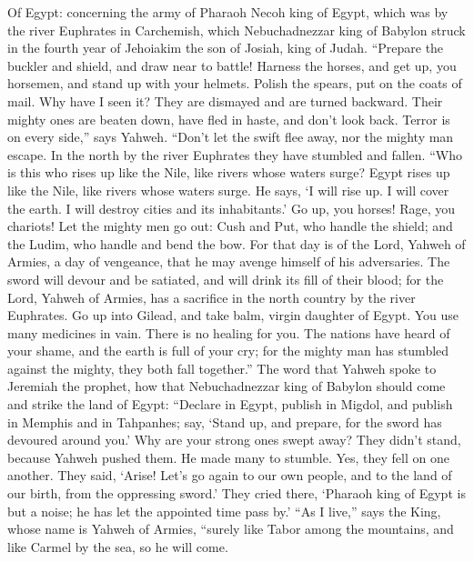  Of Egypt: concerning the army of Pharaoh Necoh king of
Egypt, which was by the river Euphrates in Carchemish, which
Nebuchadnezzar king of Babylon struck in the fourth year of Jehoiakim
the son of Josiah, king of Judah.  ``Prepare the buckler and
shield, and draw near to battle!  Harness the horses, and
get up, you horsemen, and stand up with your helmets. Polish the spears,
put on the coats of mail.  Why have I seen it? They are
dismayed and are turned backward. Their mighty ones are beaten down,
have fled in haste, and don't look back. Terror is on every side,'' says
Yahweh.  ``Don't let the swift flee away, nor the mighty man
escape. In the north by the river Euphrates they have stumbled and
fallen.  ``Who is this who rises up like the Nile, like
rivers whose waters surge?  Egypt rises up like the Nile,
like rivers whose waters surge. He says, `I will rise up. I will cover
the earth. I will destroy cities and its inhabitants.'  Go
up, you horses! Rage, you chariots! Let the mighty men go out: Cush and
Put, who handle the shield; and the Ludim, who handle and bend the bow.
 For that day is of the Lord, Yahweh of Armies, a day of
vengeance, that he may avenge himself of his adversaries. The sword will
devour and be satiated, and will drink its fill of their blood; for the
Lord, Yahweh of Armies, has a sacrifice in the north country by the
river Euphrates.  Go up into Gilead, and take balm, virgin
daughter of Egypt. You use many medicines in vain. There is no healing
for you.  The nations have heard of your shame, and the
earth is full of your cry; for the mighty man has stumbled against the
mighty, they both fall together.''  The word that Yahweh
spoke to Jeremiah the prophet, how that Nebuchadnezzar king of Babylon
should come and strike the land of Egypt:  ``Declare in
Egypt, publish in Migdol, and publish in Memphis and in Tahpanhes; say,
`Stand up, and prepare, for the sword has devoured around you.'
 Why are your strong ones swept away? They didn't stand,
because Yahweh pushed them.  He made many to stumble. Yes,
they fell on one another. They said, `Arise! Let's go again to our own
people, and to the land of our birth, from the oppressing sword.'
 They cried there, `Pharaoh king of Egypt is but a noise;
he has let the appointed time pass by.'  ``As I live,''
says the King, whose name is Yahweh of Armies, ``surely like Tabor among
the mountains, and like Carmel by the sea, so he will come.
